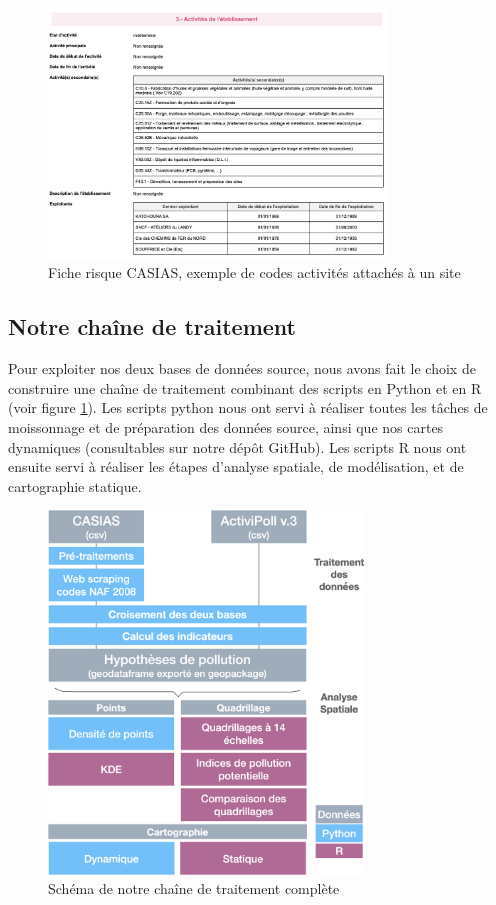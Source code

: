 \documentclass[a4paper,twoside,12pt]{book}
\begin{document}
\begin{figure}[!h]
\centering 
\includegraphics[width=0.8\textwidth]{img/chapitre3/CASIAS_FICHE_RISQUE_ZOOM_NAF2008}
\caption{Fiche risque CASIAS, exemple de codes activités attachés à un site}
\end{figure}
        
\subsection{Notre chaîne de traitement}

Pour exploiter nos deux bases de données source, nous avons fait le choix de construire une chaîne de traitement combinant des scripts en Python et en R (voir figure \ref{fig:pipeline}). Les scripts python nous ont servi à réaliser toutes les tâches de moissonnage et de préparation des données source, ainsi que nos cartes dynamiques (consultables sur notre dépôt GitHub). Les scripts R nous ont ensuite servi à réaliser les étapes d’analyse spatiale, de modélisation, et de cartographie statique. 

\begin{figure}[!h]
\centering 
\includegraphics[width=0.75\textwidth]{img/chapitre3/schema_pipeline_all.png}
\caption{Schéma de notre chaîne de traitement complète}
\label{fig:pipeline}
\end{figure}
\end{document}
